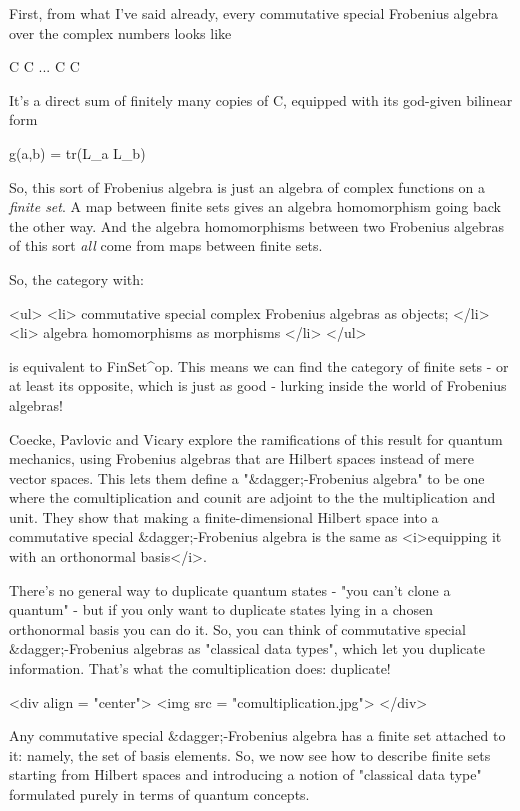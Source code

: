 First, from what I've said already, every commutative special
Frobenius algebra over the complex numbers looks like

C \oplus  C \oplus  ... C \oplus  C

It's a direct sum of finitely many copies of C, equipped with its
god-given bilinear form

g(a,b) = tr(L_{a} L_{b})

So, this sort of Frobenius algebra is just an algebra of complex
functions on a \emph{finite set}.   A map between finite sets gives an
algebra homomorphism going back the other way.  And the algebra 
homomorphisms between two Frobenius algebras of this sort \emph{all}
come from maps between finite sets.

So, the category with:

<ul>
<li>
 commutative special complex Frobenius algebras as objects;
</li>
<li>
 algebra homomorphisms as morphisms
</li>
</ul>

is equivalent to FinSet^{op}.  This means we can find the category
of finite sets - or at least its opposite, which is just as good -
lurking inside the world of Frobenius algebras!  

Coecke, Pavlovic and Vicary explore the ramifications of this result
for quantum mechanics, using Frobenius algebras that are Hilbert
spaces instead of mere vector spaces.  This lets them define 
a "&dagger;-Frobenius algebra" to be one where the
comultiplication and counit are adjoint to the the multiplication
and unit.  They show that making a finite-dimensional Hilbert space
into a commutative special &dagger;-Frobenius algebra is the same
as <i>equipping it with an orthonormal basis</i>.


There's no general
way to duplicate quantum states - "you can't clone a
quantum" - but if you only want to duplicate states lying in a
chosen orthonormal basis you can do it.  So, you can think of
commutative special &dagger;-Frobenius algebras as "classical data
types", which let you duplicate information.  That's what
the comultiplication does: duplicate!

<div align = "center">
<img src = "comultiplication.jpg">
</div>

Any commutative special &dagger;-Frobenius algebra has a finite
set attached to it: namely, the set of basis elements.
So, we now see how to describe finite sets starting from
Hilbert spaces and introducing a notion of "classical data
type" formulated purely in terms of quantum concepts. 

